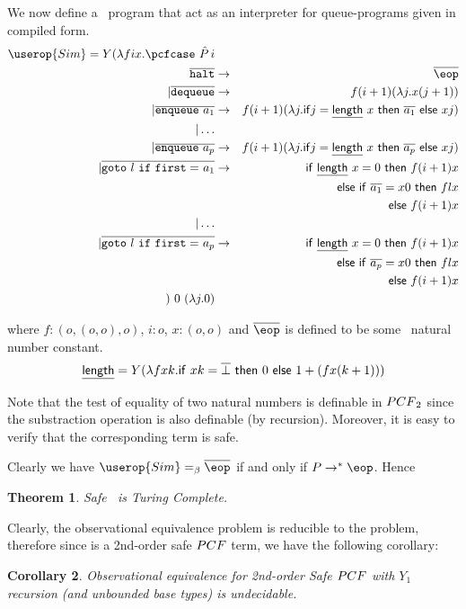 \documentclass{article}
\newtheorem{theorem}{Theorem}[section]
\newtheorem{corollary}[theorem]{Corollary}
\begin{document}
We now define a \pcf\ program that act as an interpreter for queue-programs given in compiled form.
\begin{eqnarray*}
\userop{Sim} = Y ( \lambda f i x . \pcfcase\ \hat{P}\, i    \\
 \encode{ \tt halt }&\rightarrow& \encode{\eop} \\
| \encode{ {\tt dequeue } } &\rightarrow& f (i+1) (\lambda j . x (j+1) ) \\
| \encode{ {\tt enqueue\ } a_1 } &\rightarrow& f (i+1) ( \lambda j . {\sf if} j = \underline{\sf length}\ x\ {\sf then\ } \encode{a_1} {\sf\ else\ } x j ) \\
| \ldots \\
| \encode{ {\tt enqueue\ } a_p } &\rightarrow& f (i+1) ( \lambda j . {\sf if} j = \underline{\sf length}\ x\ {\sf then\ } \encode{a_p} {\sf\ else\ } x j ) \\
| \encode{ {\tt goto\ } l {\tt\ if\ first=\ } a_1 } &\rightarrow&
{\sf if\ } \underline{\sf length}\ x = 0 {\ \sf then\ } f (i+1) x \\
&&{\sf else\ if\ } \encode{a_1} = x 0 {\sf\ then\ } f l x \\
&&{\sf else\ } f (i+1) x \\
| \ldots \\
| \encode{{\tt goto\ } l {\tt\ if\ first=\ } a_p} &\rightarrow&
{\sf if\ } \underline{\sf length}\ x = 0 {\ \sf then\ } f (i+1) x \\
&&{\sf else\ if\ } \encode{a_p} = x 0 {\sf\ then\ } f l x \\
&&{\sf else\ } f (i+1) x \\
)\ 0\ (\lambda j . 0)
\end{eqnarray*}

where $f: (o,(o,o),o)$, $i:o$, $x:(o,o)$ and $\encode{\eop}$ is defined to be some \pcf\ natural number constant.
$$ \underline{\sf  length}  = Y( \lambda f x k . {\sf if\ } x k = \overline{\bot} {\sf\ then\ } 0 {\sf\ else\ } 1 + (f x (k+1)))$$

Note that the test of equality of two natural numbers is definable in ${PCF}_2$ since the substraction operation is  also definable (by recursion). Moreover, it is easy to verify that the corresponding term is safe.

Clearly we have $\userop{Sim} =_\beta \encode{\eop}$ if and only if $P \rightarrow^* \eop$. Hence
\begin{theorem}
  Safe \pcf\ is Turing Complete.
\end{theorem}

Clearly, the observational equivalence problem is reducible to the  problem, therefore since  is a 2nd-order safe ${PCF}$ term, we have the following corollary:
\begin{corollary}
Observational equivalence for 2nd-order Safe ${PCF}$ with $Y_1$ recursion (and unbounded base types) is undecidable.
\end{corollary}
\end{document}
